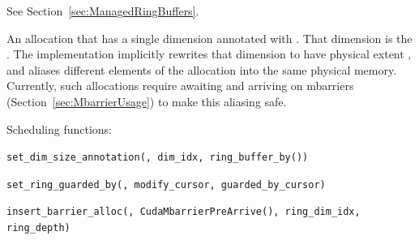 
See Section~\ref{sec:ManagedRingBuffers}.

An allocation that has a single dimension annotated with .
That dimension is the .
The implementation implicitly rewrites that dimension to have physical extent , and aliases different elements of the allocation into the same physical memory.
Currently, such allocations require awaiting and arriving on mbarriers (Section~\ref{sec:MbarrierUsage}) to make this aliasing safe.

Scheduling functions:

\texttt{set\_dim\_size\_annotation(, dim\_idx, ring\_buffer\_by())}

\texttt{set\_ring\_guarded\_by(, modify\_cursor, guarded\_by\_cursor)}

\texttt{insert\_barrier\_alloc(, CudaMbarrierPreArrive(), ring\_dim\_idx, ring\_depth)}
